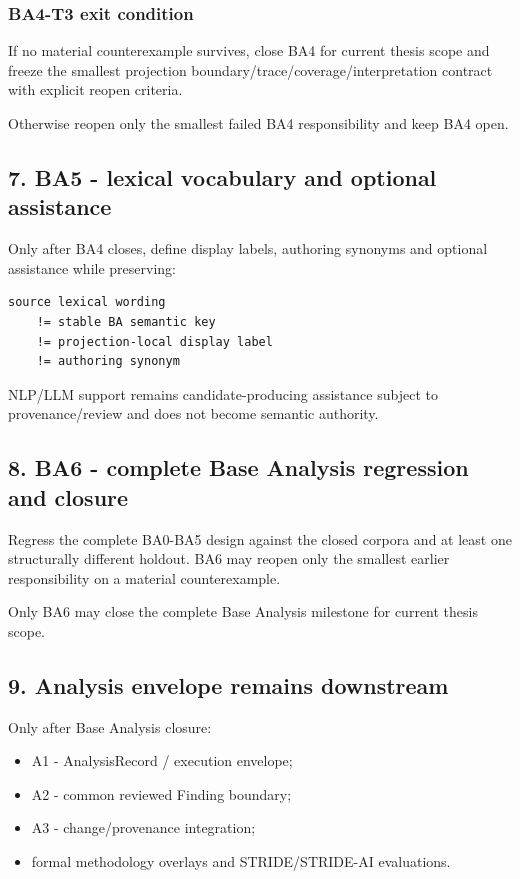 \documentclass[11pt,a4paper]{article}
\providecommand{\tightlist}{\setlength{\itemsep}{0pt}\setlength{\parskip}{0pt}}
\begin{document}
\subsubsection{BA4-T3 exit condition}\label{ba4-t3-exit-condition}

If no material counterexample survives, close BA4 for current thesis
scope and freeze the smallest projection
boundary/trace/coverage/interpretation contract with explicit reopen
criteria.

Otherwise reopen only the smallest failed BA4 responsibility and keep
BA4 open.

\subsection{7. BA5 - lexical vocabulary and optional
assistance}\label{7-ba5---lexical-vocabulary-and-optional-assistance}

Only after BA4 closes, define display labels, authoring synonyms and
optional assistance while preserving:

\begin{verbatim}
source lexical wording
    != stable BA semantic key
    != projection-local display label
    != authoring synonym
\end{verbatim}

NLP/LLM support remains candidate-producing assistance subject to
provenance/review and does not become semantic authority.

\subsection{8. BA6 - complete Base Analysis regression and
closure}\label{8-ba6---complete-base-analysis-regression-and-closure}

Regress the complete BA0-BA5 design against the closed corpora and at
least one structurally different holdout. BA6 may reopen only the
smallest earlier responsibility on a material counterexample.

Only BA6 may close the complete Base Analysis milestone for current
thesis scope.

\subsection{9. Analysis envelope remains
downstream}\label{9-analysis-envelope-remains-downstream}

Only after Base Analysis closure:

\begin{itemize}
\tightlist
\item
  A1 - AnalysisRecord / execution envelope;
\item
  A2 - common reviewed Finding boundary;
\item
  A3 - change/provenance integration;
\item
  formal methodology overlays and STRIDE/STRIDE-AI evaluations.
\end{itemize}
\end{document}
